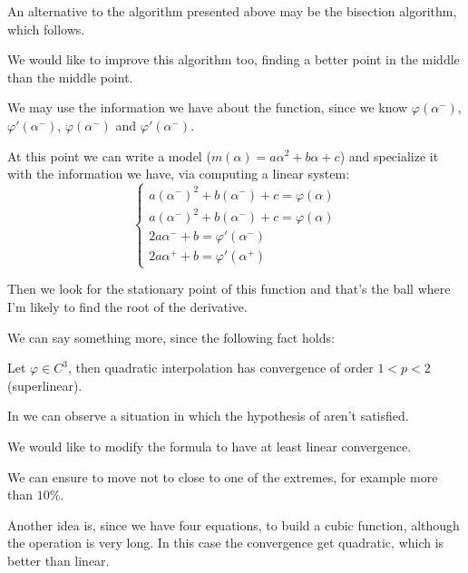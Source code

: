 \documentclass[ComputationalMathematics.tex]{subfiles}
\begin{document}
An alternative to the algorithm presented above may be the bisection algorithm, which follows.



We would like to improve this algorithm too, finding a better point in the middle than the middle point.


We may use the information we have about the function, since we know $\varphi(\alpha^{-})$, $\varphi ' (\alpha^{-})$, $\varphi(\alpha^{-})$ and $\varphi ' (\alpha^{-})$.

At this point we can write a model ($m(\alpha) = a {\alpha}^{2} + b \alpha + c$) and specialize it with the information we have, via computing a linear system:
\[
\begin{cases}
  a {(\alpha^{-})}^{2} + b (\alpha^{-}) + c = \varphi(\alpha)\\
  a {(\alpha^{-})}^{2} + b (\alpha^{-}) + c = \varphi(\alpha)\\
  2a \alpha^{-} + b = \varphi'(\alpha^{-})\\
  2a \alpha^{+} + b = \varphi'(\alpha^{+})
\end{cases}
\]

Then we look for the stationary point of this function and that's the ball where I'm likely to find the root of the derivative.

We can say something more, since the following fact holds:

\begin{proposition}\label{fact:24ott3}
Let $\varphi \in C^{{3}}$, then quadratic interpolation has convergence of order $1 < p < 2$ (superlinear).
\end{proposition}

In  we can observe a situation in which the hypothesis of  aren't satisfied.


We would like to modify the formula to have at least linear convergence.

We can ensure to move not to close to one of the extremes, for example more than $10\%$.

Another idea is, since we have four equations, to build a cubic function, although the operation is very long. In this case the convergence get quadratic, which is better than linear.
\end{document}
